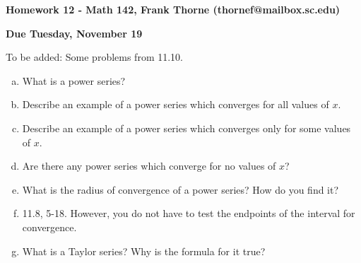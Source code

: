 \documentclass[12pt]{article}
\begin{document}
\setlength{\topmargin}{-2mm}





\begin{center}{\bf Homework 12 - Math 142, Frank Thorne (thornef@mailbox.sc.edu)}
\end{center}
\begin{center}
{\bf Due Tuesday, November 19}
\end{center}
To be added: Some problems from 11.10.

\begin{enumerate}[(a)]
\item
What is a power series?

\item
Describe an example of a power series which converges for all values of $x$.

\item
Describe an example of a power series which converges only for some values of $x$.

\item
Are there any power series which converge for no values of $x$?

\item
What is the radius of convergence of a power series? How do you find it?

\item
11.8, 5-18. However, you do not have to test the endpoints of the interval for convergence.

\item
What is a Taylor series? Why is the formula for it true?


\end{enumerate}
\end{document}
